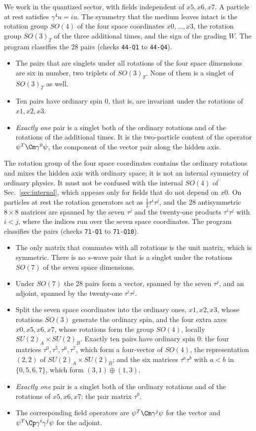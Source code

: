 We work in the quantized sector, with fields independent of $x5,x6,x7$. A particle at rest satisfies
$\gamma^4u=iu$. The symmetry that the medium leaves intact is the rotation group $SO(4)$ of the four
space coordinates $x0,\dots,x3$, the rotation group $SO(3)_T$ of the three additional times, and the
sign of the grading $W$. The program classifies the 28 pairs (checks \texttt{44-Q1} to
\texttt{44-Q4}).
\begin{itemize}
\item The pairs that are singlets under all rotations of the four space dimensions are six in number,
two triplets of $SO(3)_T$. None of them is a singlet of $SO(3)_T$ as well.
\item Ten pairs have ordinary spin 0, that is, are invariant under the rotations of $x1,x2,x3$.
\item \emph{Exactly one} pair is a singlet both of the ordinary rotations and of the rotations of
the additional times. It is the two-particle content of the operator $\psi^T\Cm\gamma^0\psi$, the
component of the vector pair along the hidden axis.
\end{itemize}
The rotation group of the four space coordinates contains the ordinary rotations and mixes the hidden
axis with ordinary space; it is not an internal symmetry of ordinary physics. It must not be confused
with the internal $SO(4)$ of Sec.~\ref{sec:internal}, which appears only for fields that do not
depend on $x0$.
On particles at rest the rotation generators act as $\tfrac12\tau^i\tau^j$, and the 28 antisymmetric
$8\times8$ matrices are spanned by the seven $\tau^j$ and the twenty-one products $\tau^i\tau^j$ with
$i<j$, where the indices run over the seven space coordinates. The program classifies the pairs
(checks \texttt{71-Q1} to \texttt{71-Q10}).
\begin{itemize}
\item The only matrix that commutes with all rotations is the unit matrix, which is symmetric. There
is no $s$-wave pair that is a singlet under the rotations $SO(7)$ of the seven space dimensions.
\item Under $SO(7)$ the 28 pairs form a vector, spanned by the seven $\tau^j$, and an adjoint,
spanned by the twenty-one $\tau^i\tau^j$.
\item Split the seven space coordinates into the ordinary ones, $x1,x2,x3$, whose rotations $SO(3)$
generate the ordinary spin, and the four extra axes $x0,x5,x6,x7$, whose rotations form the group
$SO(4)$, locally $SU(2)_A\times SU(2)_B$. Exactly ten pairs have ordinary spin 0: the four matrices
$\tau^0,\tau^5,\tau^6,\tau^7$, which form a four-vector of $SO(4)$, the representation $(2,2)$ of
$SU(2)_A\times SU(2)_B$; and the six matrices $\tau^a\tau^b$ with $a<b$ in $\{0,5,6,7\}$, which form
$(3,1)\oplus(1,3)$.
\item \emph{Exactly one} pair is a singlet both of the ordinary rotations and of the rotations of
$x5,x6,x7$: the pair matrix $\tau^0$.
\item The corresponding field operators are $\psi^T\Cm\gamma^j\psi$ for the vector and
$\psi^T\Cp\gamma^i\gamma^j\psi$ for the adjoint.
\end{itemize}

